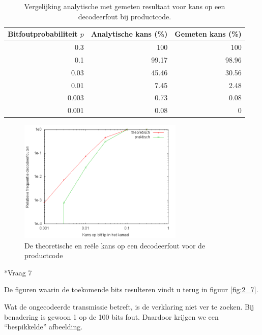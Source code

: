 \documentclass[]{article}
\begin{document}
\begin{section}
\begin{subsection}
        \begin{table}[h]
            \centering	
            \begin{tabular}{r|r|r}
                Bitfoutprobabiliteit $p$ &
                Analytische kans (\%) &
                Gemeten kans (\%)\\
                \hline
                0.3   & 100    & 100   \\
                0.1   &  99.17 & 98.96 \\
                0.03  &  45.46 & 30.56 \\
                0.01  &   7.45 & 2.48  \\
                0.003 &   0.73 & 0.08  \\
                0.001 &   0.08 & 0
            \end{tabular}
            \caption{Vergelijking analytische met gemeten resultaat
            voor kans op een decodeerfout bij productcode.}
            \label{tab:2_6}
        \end{table}    
        \begin{figure}[h]
            \centering
            \includegraphics[width=0.7\textwidth]{vraag2_6.png}
            \caption{De theoretische en re\"ele kans op een
            decodeerfout voor de productcode}
            \label{fig:2_6}
        \end{figure}
    \end{subsection}
	
    \begin{subsection}*{Vraag 7} %

        De figuren waarin de toekomende bits resulteren vindt u terug
        in figuur \ref{fig:2_7}.

        Wat de ongecodeerde transmissie betreft, is de verklaring niet
        ver te zoeken. Bij benadering is gewoon 1 op de 100 bits fout.
        Daardoor krijgen we een ``bespikkelde'' afbeelding.


\end{subsection}
\end{section}
\end{document}
